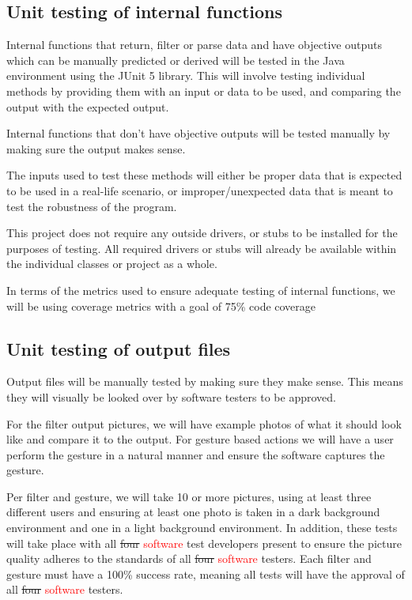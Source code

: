 \documentclass[12pt, titlepage]{article}
\begin{document}
\subsection{Unit testing of internal functions} 

\hspace{\parindent} Internal functions that return, filter or parse data and have objective outputs which can be manually predicted or derived will be tested in the Java environment using the JUnit 5 library. This will involve testing individual methods by providing them with an input or data to be used, and comparing the output with the expected output.

Internal functions that don't have objective outputs will be tested manually by making sure the output makes sense.

The inputs used to test these methods will either be proper data that is expected to be used in a real-life scenario, or improper/unexpected data that is meant to test the robustness of the program.

This project does not require any outside drivers, or stubs to be installed for the purposes of testing. All required drivers or stubs will already be available within the individual classes or project as a whole.

In terms of the metrics used to ensure adequate testing of internal functions, we will be using coverage metrics with a goal of 75\% code coverage
		
\subsection{Unit testing of output files}
\hspace{\parindent}Output files will be manually tested by making sure they make sense. This means they will visually be looked over by software testers to be approved.

For the filter output pictures, we will have example photos of what it should look like and compare it to the output. For gesture based actions we will have a user perform the gesture in a natural manner and ensure the software captures the gesture.

Per filter and gesture, we will take 10 or more pictures, using at least three different users and ensuring at least one photo is taken in a dark background environment and one in a light background environment. In addition, these tests will take place with all \sout{four} \textcolor{red}{software} test developers present to ensure the picture quality adheres to the standards of all \sout{four} \textcolor{red}{software} testers. Each filter and gesture must have a 100\% success rate, meaning all tests will have the approval of all \sout{four} \textcolor{red}{software} testers.




\end{document}
